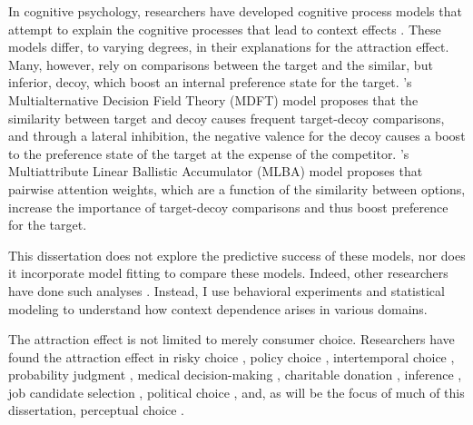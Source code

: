 In cognitive psychology, researchers have developed cognitive process models that attempt to explain the cognitive processes that lead to context effects \parencite{truebloodMultiattributeLinearBallistic,roeMultialternativeDecisionField2001a,usherLossAversionInhibition2004a,bhatiaAssociationsAccumulationPreference2013b,noguchiMultialternativeDecisionSampling2018a,wollschlager2NaryChoiceTree2012a,bergnerVAMPVotingAgent2019b,tverskyEliminationAspectsTheory1972,tversky1993context}. These models differ, to varying degrees, in their explanations for the attraction effect. Many, however, rely on comparisons between the target and the similar, but inferior, decoy, which boost an internal  preference state for the target. \textcite{roeMultialternativeDecisionField2001a}'s Multialternative Decision Field Theory (MDFT) model proposes that the similarity between target and decoy causes frequent target-decoy comparisons, and through a lateral inhibition, the negative valence for the decoy causes a boost to the preference state of the target at the expense of the competitor. \textcite{truebloodMultiattributeLinearBallistic}'s Multiattribute Linear Ballistic Accumulator (MLBA) model proposes that pairwise attention weights, which are a function of the similarity between options, increase the importance of target-decoy comparisons and thus boost preference for the target. 

This dissertation does not explore the predictive success of these models, nor does it incorporate model fitting to compare these models. Indeed, other researchers have done such analyses \parencite{turnerCompetingTheoriesMultialternative2018a,cataldoModelingPreferenceReversals2021,evansResponsetimeDataProvide2019b,molloyWhatResponseTime2019a,berkowitschRigorouslyTestingMultialternative2014b}. Instead, I use behavioral experiments and statistical modeling to understand how context dependence arises in various domains.

The attraction effect is not limited to merely consumer choice. Researchers have found the attraction effect in risky choice \parencite{mohr2017attraction}, policy choice \parencite{herneDecoyAlternativesPolicy1997b}, intertemporal choice \parencite{mariniAttractionComesMany2020}, probability judgment \parencite{caiWhenAlternativeHypotheses2023}, medical decision-making \parencite{schwartz1999more}, charitable donation \parencite{pittarello2020three},  inference \parencite{truebloodMultialternativeContextEffects2012}, job candidate selection \parencite{highhouseContextDependentSelectionEffects1996}, political choice \parencite{pan1995attractiovoting}, and, as will be the focus of much of this dissertation, perceptual choice \parencite{evansImpactPresentationOrder2021,trueblood2013not,spektorRepulsionEffectPreferential2022,spektorWhenGoodLooks2018b,yearsleyContextEffectsSimilarity2022,turnerCompetingTheoriesMultialternative2018a,liaoInfluenceDistanceDecoy2021}. 

